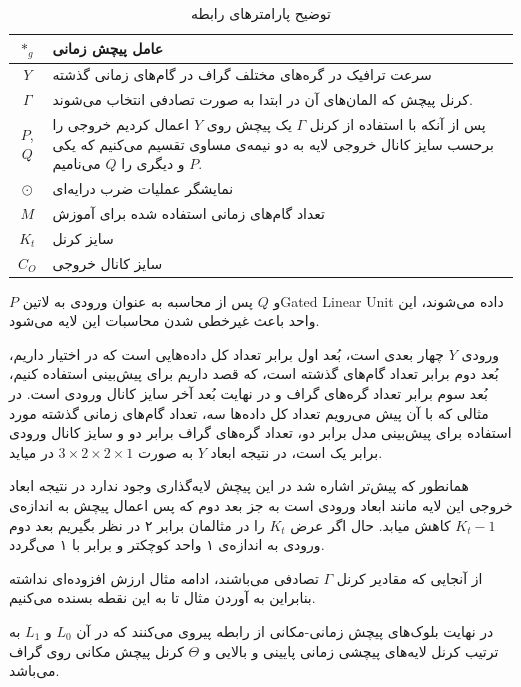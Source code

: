 \begin{table}[h]
  \centering
  \caption{توضیح پارامترهای رابطه }
  \begin{tabular}{|c|p{}|}
    \hline
    $*_{g}$ & عامل پیچش زمانی \\
    \hline
    $Y$ & سرعت ترافیک در گره‌های مختلف گراف در گام‌های زمانی گذشته \\
    \hline
    $\Gamma$ & کرنل پیچش که المان‌های آن در ابتدا به صورت تصادفی انتخاب می‌شوند. \\
    \hline
    $P$, $Q$ & پس از آنکه با استفاده از کرنل $\Gamma$ یک پیچش روی $Y$ اعمال کردیم خروجی را برحسب سایز کانال خروجی لایه به دو نیمه‌ی مساوی تقسیم می‌کنیم که یکی $P$ و دیگری را $Q$ می‌نامیم. \\
    \hline
    $\odot$ & نمایشگر عملیات ضرب درایه‌ای \\
    \hline
    $M$ & تعداد گام‌های زمانی استفاده شده برای آموزش \\
    \hline
    $K_{t}$ & سایز کرنل \\
    \hline
    $C_{O}$ & سایز کانال خروجی \\
    \hline
  \end{tabular}
  \label{tbl:distance}
\end{table}

 $P$ و $Q$ پس از محاسبه به عنوان ورودی به ‌لاتین{Gated Linear Unit} داده می‌شوند، این واحد باعث غیرخطی شدن محاسبات این لایه می‌شود.

ورودی $Y$ چهار بعدی است، بُعد اول برابر تعداد کل داده‌هایی است که در اختیار داریم، بُعد دوم برابر
تعداد گام‌های گذشته است، که قصد داریم برای پیش‌بینی استفاده کنیم،
بُعد سوم برابر تعداد گره‌های گراف و در نهایت بُعد آخر سایز کانال ورودی است.
در مثالی که با آن پیش می‌رویم تعداد کل داده‌ها سه، تعداد گام‌های زمانی گذشته مورد استفاده برای پیش‌بینی مدل برابر دو،
تعداد گره‌های گراف برابر دو و سایز کانال ورودی برابر یک است، در نتیجه ابعاد $Y$ به صورت $ 3 \times 2 \times 2 \times 1 $ در میاید.

همانطور که پیش‌تر اشاره شد در این پیچش لایه‌گذاری وجود ندارد در نتیجه ابعاد خروجی این لایه مانند ابعاد ورودی است به جز بعد دوم
که پس اعمال پیچش به اندازه‌ی $K_{t}-1$ کاهش میابد. حال اگر عرض $K_{t}$ را در مثالمان برابر ۲ در نظر بگیریم
بعد دوم ورودی به اندازه‌ی ۱ واحد کوچکتر و برابر با ۱ می‌گردد.

از آنجایی که مقادیر کرنل $\Gamma$ تصادفی می‌باشند، ادامه مثال ارزش افزوده‌ای نداشته بنابراین به آوردن مثال تا به این نقطه بسنده می‌کنیم.

در نهایت بلوک‌های پیچش زمانی-مکانی از رابطه  پیروی می‌کنند که در آن $L_{0}$ و $L_{1}$ به ترتیب کرنل‌ لایه‌های پیچشی زمانی پایینی و بالایی و $\Theta$ کرنل پیچش مکانی روی گراف می‌باشد.

